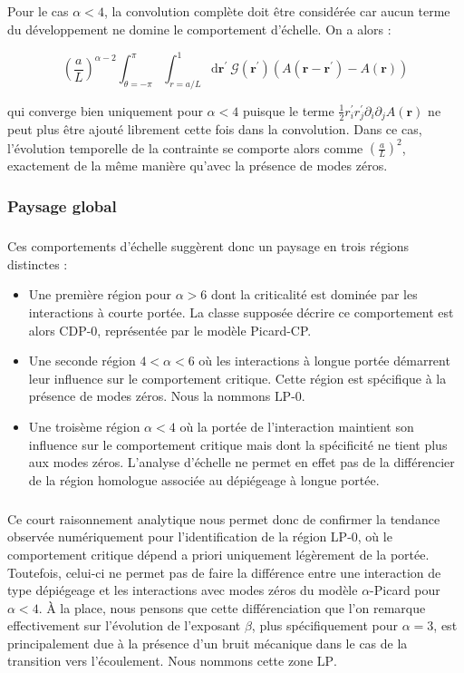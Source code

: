 \subparagraph{}Pour le cas $\alpha<4$, la convolution complète doit être considérée car aucun terme du développement ne domine le comportement d'échelle. On a alors :

\begin{equation}
    \left( \frac{a}{L} \right)^{\alpha - 2}\int_{\theta=-\pi}^\pi\int_{r=a/L}^{1} \mathrm{d}\mathbf{r}^\prime ~ \mathcal{G}(\mathbf{r}^\prime)
    \left( A(\mathbf{r}-\mathbf{r}^\prime)-A(\mathbf{r})\right)
\end{equation}

\noindent qui converge bien uniquement pour $\alpha<4$ puisque le terme $\frac{1}{2}r_i^\prime r_j^\prime \partial_i\partial_jA(\mathbf{r})$ ne peut plus être ajouté librement cette fois dans la convolution. Dans ce cas, l'évolution temporelle de la contrainte se comporte alors comme $\left(  \frac{a}{L}\right)^2$, exactement de la même manière qu'avec la présence de modes zéros.

\subsubsection{Paysage global}

\subparagraph{}Ces comportements d'échelle suggèrent donc un paysage en trois régions distinctes :

\begin{itemize}
	\item Une première région pour $\alpha>6$ dont la criticalité est dominée par les interactions à courte portée. La classe supposée décrire ce comportement est alors CDP-0, représentée par le modèle Picard-CP.
	\item Une seconde région $4<\alpha<6$ où les interactions à longue portée démarrent leur influence sur le comportement critique. Cette région est spécifique à la présence de modes zéros. Nous la nommons $\text{LP-0}$.
	\item Une troisème région $\alpha <4$ où la portée de l'interaction maintient son influence sur le comportement critique mais dont la spécificité ne tient plus aux modes zéros. L'analyse d'échelle ne permet en effet pas de la différencier de la région homologue associée au dépiégeage à longue portée.
\end{itemize}

\subparagraph{}Ce court raisonnement analytique nous permet donc de confirmer la tendance observée numériquement pour l'identification de la région LP-0, où le comportement critique dépend a priori uniquement légèrement de la portée. Toutefois, celui-ci ne permet pas de faire la différence entre une interaction de type dépiégeage et les interactions avec modes zéros du modèle $\alpha$-Picard pour $\alpha<4$. \`A la place, nous pensons que cette différenciation que l'on remarque effectivement sur l'évolution de l'exposant $\beta$, plus spécifiquement pour $\alpha = 3$, est principalement due à la présence d'un bruit mécanique dans le cas de la transition vers l'écoulement. Nous nommons cette zone $\text{LP}$.


